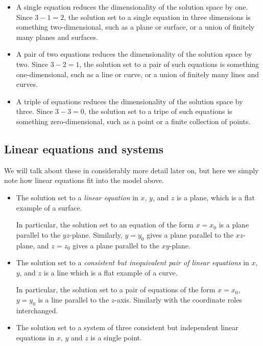 \documentclass[10pt]{amsart}
\begin{document}
\begin{itemize}
\item A single equation reduces the dimensionality of the solution
  space by one. Since $3 - 1 = 2$, the solution set to a single
  equation in three dimensions is something two-dimensional, such as a
  plane or surface, or a union of finitely many planes and surfaces.
\item A pair of two equations reduces the dimensionality of the
  solution space by two. Since $3 - 2 = 1$, the solution set to a pair
  of such equations is something one-dimensional, such as a line or
  curve, or a union of finitely many lines and curves.
\item A triple of equations reduces the dimensionality of the solution
  space by three. Since $3 - 3 = 0$, the solution set to a tripe of
  such equations is something zero-dimensional, such as a point or a
  finite collection of points.
\end{itemize}

\subsection{Linear equations and systems}

We will talk about these in considerably more detail later on, but
here we simply note how linear equations fit into the model above.

\begin{itemize}
\item The solution set to a {\em linear equation} in $x$, $y$, and $z$
  is a plane, which is a flat example of a surface.

  In particular, the solution set to an equation of the form $x = x_0$
  is a plane parallel to the $yz$-plane. Similarly, $y = y_0$ gives a
  plane parallel to the $xz$-plane, and $z = z_0$ gives a plane
  parallel to the $xy$-plane.
\item The solution set to a {\em consistent but inequivalent pair of
  linear equations} in $x$, $y$, and $z$ is a line which is a flat
  example of a curve.

  In particular, the solution set to a pair of equations of the form
  $x = x_0$, $y = y_0$ is a line parallel to the $z$-axis. Similarly
  with the coordinate roles interchanged.
\item The solution set to a system of three consistent but independent
  linear equations in $x$, $y$ and $z$ is a single point.
\end{itemize}
\end{document}
